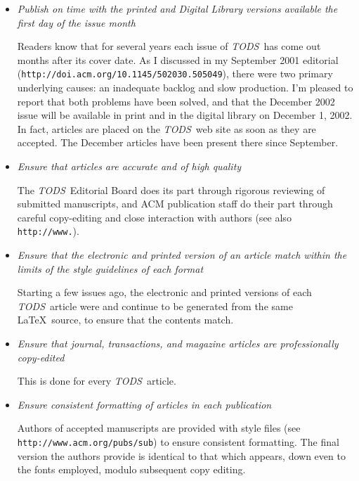 \documentclass{article}
\newcommand{\tods}{{\em TODS\/}}
\begin{document}
\begin{itemize}
\item {\em Publish on time with the printed and Digital Library versions
  available the first day of the issue month}

  Readers know that for several years each issue of \tods\ has come out
  months after its cover date. As I discussed in my September 2001
  editorial ({\tt http://doi.acm.org/10.1145/502030.505049}),
  there were two primary underlying causes: an inadequate backlog 
  and slow production. I'm pleased to report that both problems
  have been solved, and that the December 2002 issue will be available in print
  and in the digital library on December 1, 2002. In fact, articles are
  placed on the \tods\ web site as soon as they are accepted. The December
  articles have been present there since September.

\item {\em Ensure that articles are accurate and of high quality}

  The \tods\ Editorial Board does its part through rigorous reviewing of
  submitted manuscripts, and ACM publication staff do their part through
  careful copy-editing and close interaction with authors (see also
  {\tt http://www.}).

\item {\em Ensure that the electronic and printed version of an article
  match within the limits of the style guidelines of each format}

  Starting a few issues ago, the electronic and printed versions of each
  \tods\ article were and continue to be
  generated from the same \LaTeX\ source, to ensure that the contents match.

\item {\em Ensure that journal, transactions, and magazine articles are
  professionally copy-edited}

  This is done for every \tods\ article.

\item {\em Ensure consistent formatting of articles in each publication}

  Authors of accepted manuscripts are provided with style files (see {\tt
  http://www.acm.org/pubs/sub}) to ensure consistent
  formatting. The final version the authors provide is identical to that
  which appears, down even to the fonts employed, modulo subsequent copy editing.


\end{itemize}
\end{document}
